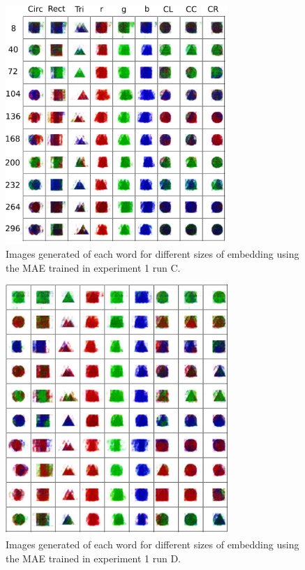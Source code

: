 \begin{figure}
\centering
\includegraphics[width=0.75\textwidth]{Figs/shapes/singlelabel331C.png}
\caption{Images generated of each word for different sizes of embedding using the MAE trained in experiment 1 run C.}
\label{fig:331singleC}
\end{figure}
\begin{figure}
\centering
\includegraphics[width=0.75\textwidth]{Figs/shapes/singlelabel331D.png}
\caption{Images generated of each word for different sizes of embedding using the MAE trained in experiment 1 run D.}
\label{fig:331singleD}
\end{figure}


